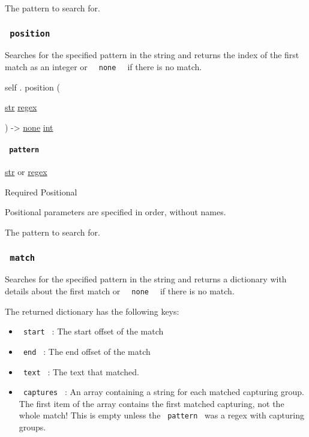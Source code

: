 The pattern to search for.

\subsubsection{\texorpdfstring{\texttt{\ position\ }}{ position }}\label{definitions-position}

Searches for the specified pattern in the string and returns the index
of the first match as an integer or
\texttt{\ }{\texttt{\ none\ }}\texttt{\ } if there is no match.

self { . } { position } (

{ \href{/docs/reference/foundations/str/}{str}
\href{/docs/reference/foundations/regex/}{regex} }

) -\textgreater{} \href{/docs/reference/foundations/none/}{none}
\href{/docs/reference/foundations/int/}{int}

\paragraph{\texorpdfstring{\texttt{\ pattern\ }}{ pattern }}\label{definitions-position-pattern}

\href{/docs/reference/foundations/str/}{str} {or}
\href{/docs/reference/foundations/regex/}{regex}

{Required} {{ Positional }}

\label{definitions-position-pattern-positional-tooltip}
Positional parameters are specified in order, without names.

The pattern to search for.

\subsubsection{\texorpdfstring{\texttt{\ match\ }}{ match }}\label{definitions-match}

Searches for the specified pattern in the string and returns a
dictionary with details about the first match or
\texttt{\ }{\texttt{\ none\ }}\texttt{\ } if there is no match.

The returned dictionary has the following keys:

\begin{itemize}
\tightlist
\item
  \texttt{\ start\ } : The start offset of the match
\item
  \texttt{\ end\ } : The end offset of the match
\item
  \texttt{\ text\ } : The text that matched.
\item
  \texttt{\ captures\ } : An array containing a string for each matched
  capturing group. The first item of the array contains the first
  matched capturing, not the whole match! This is empty unless the
  \texttt{\ pattern\ } was a regex with capturing groups.
\end{itemize}

